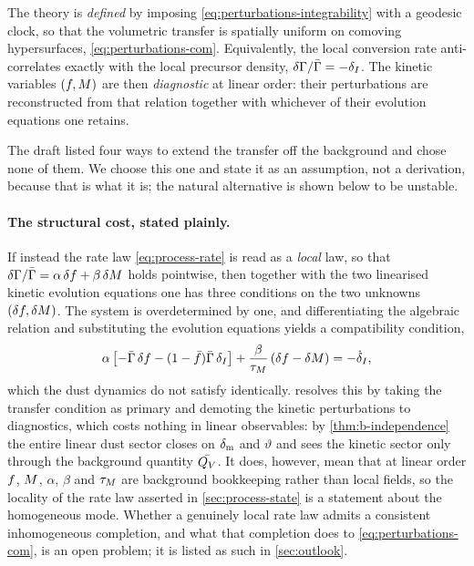 \begin{assumption}\label{asm:geodesic}
  The theory is \emph{defined} by imposing
  \cref{eq:perturbations-integrability} with a geodesic clock, so that the
  volumetric transfer is spatially uniform on comoving hypersurfaces,
  \cref{eq:perturbations-com}. Equivalently, the local conversion rate
  anti-correlates exactly with the local precursor density,
  $\delta\Gamma/\bar{\Gamma}=-\delta_I$. The kinetic variables $(f,M)$ are
  then \emph{diagnostic} at linear order: their perturbations are reconstructed
  from that relation together with whichever of their evolution equations one
  retains.
\end{assumption}

The draft listed four ways to extend the transfer off the background and chose
none of them. We choose this one and state it as an assumption, not a
derivation, because that is what it is; the natural alternative is shown below
to be unstable.

\paragraph{The structural cost, stated plainly.} If instead the rate law
\cref{eq:process-rate} is read as a \emph{local} law, so that
$\delta\Gamma/\bar{\Gamma}=\alpha\,\delta f+\beta\,\delta M$ holds
pointwise, then together with the two linearised kinetic evolution equations
one has three conditions on the two unknowns $(\delta f,\delta M)$.
The system is overdetermined by one, and differentiating the algebraic relation
and substituting the evolution equations yields a compatibility condition,
%
\begin{equation}\label{eq:perturbations-compatibility}
  \alpha\left[-\bar{\Gamma}\,\delta f
    -(1-\bar {f})\bar{\Gamma}\,\delta_I\right]
  +\frac{\beta}{\tau_{M}}\left(\delta f-\delta M\right)
  =-\dot\delta_I ,
\end{equation}
%
which the dust dynamics do not satisfy identically. 
resolves this by taking the transfer condition as primary and demoting the
kinetic perturbations to diagnostics, which costs nothing in linear
observables: by \cref{thm:b-independence} the entire linear dust sector closes
on $\delta_{\rm m}$ and $\vartheta$ and sees the kinetic sector only through
the background quantity $\bar {Q_{V}}$. It does, however, mean that at linear order
$f$, $M$, $\alpha$, $\beta$ and $\tau_{M}$ are background bookkeeping
rather than local fields, so the locality of the rate law asserted in
\cref{sec:process-state} is a statement about the homogeneous mode. Whether a
genuinely local rate law admits a consistent inhomogeneous completion, and what
that completion does to \cref{eq:perturbations-com}, is an open problem; it is
listed as such in \cref{sec:outlook}.

